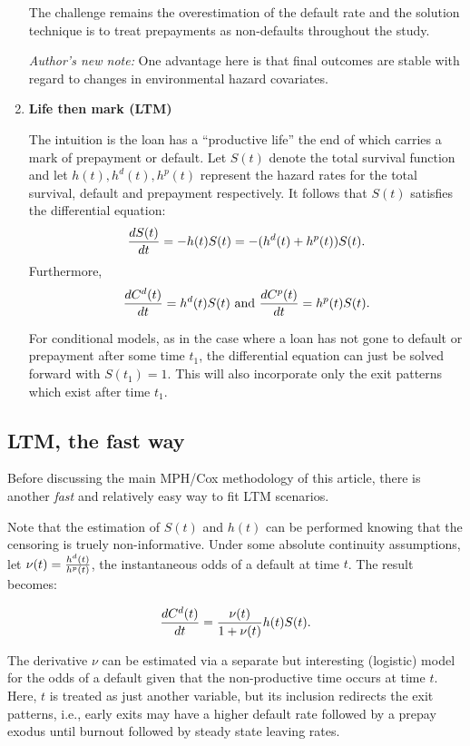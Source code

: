 \documentclass[10pt]{article}
\begin{document}
\begin{enumerate}
	The challenge remains the overestimation of the default rate and the solution technique is to treat prepayments as non-defaults 
	throughout the study.

    {\em Author's new note:} One advantage here is that final outcomes are stable with regard to changes in environmental hazard covariates.


\item {\bf Life then mark (LTM)}

	The intuition is the loan has a ``productive life'' the end of which carries a mark of prepayment or default.  
	Let $S(t)$ denote the total survival function and let $h(t), h^d(t), h^p(t)$ represent the hazard rates for the total survival, default and
	prepayment respectively.  It follows that $S(t)$ satisfies the differential equation:
	$$ {dS(t) \over dt}=-h(t)S(t)=-(h^d(t)+h^p(t))S(t).$$
	Furthermore,
	$$ {dC^d(t) \over dt}=h^d(t)S(t) \text{~and~} {dC^p(t) \over dt}=h^p(t)S(t).$$

	For conditional models, as in the case where a loan has not gone to default or prepayment after some time $t_1$, the differential equation can just be 
	solved forward with $S(t_1)=1$.  This will also incorporate only the exit patterns which exist after time $t_1$.

\end{enumerate}


\subsection{LTM, the fast way}

    Before discussing the main MPH/Cox methodology of this article, there is another {\em fast} and relatively easy way to fit LTM
    scenarios.

	Note that the estimation of $S(t)$ and $h(t)$ can be performed knowing that the censoring is truely non-informative.  Under some absolute 
	continuity assumptions, let $\nu(t)={h^d(t) \over h^p(t)}$, the instantaneous odds of a default at time $t$.  The result becomes:

	$$ {dC^d(t) \over dt}={\nu(t)\over 1+\nu(t)}h(t)S(t).$$

	The derivative $\nu$ can be estimated via a separate but interesting (logistic) model for the odds of a default given that the non-productive time
	occurs at time $t$.  Here, $t$ is treated as just another variable, but its inclusion redirects the exit patterns, i.e., early exits may have a higher 
	default rate followed by a prepay exodus until burnout followed by steady state leaving rates. 
\end{document}

